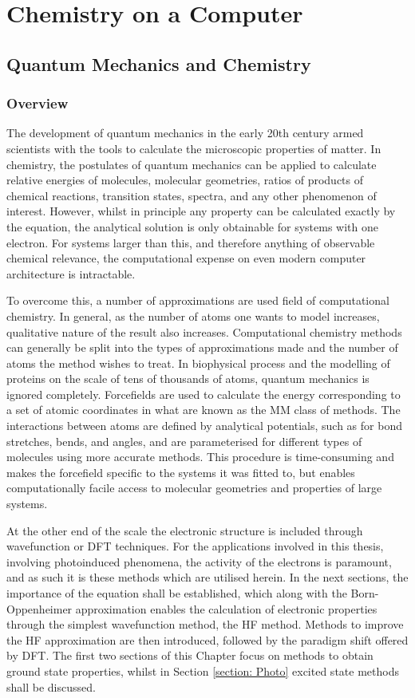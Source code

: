 \chapter{Chemistry on a Computer}
\label{chapter:theory}
\section{Quantum Mechanics and Chemistry}\label{section: QM}
\subsection{Overview}\label{section: QM_overview}
The development of quantum mechanics in the early 20th century armed scientists with the tools to calculate the microscopic properties of matter. In chemistry, the postulates of quantum mechanics can be applied to calculate relative energies of molecules, molecular geometries, ratios of products of chemical reactions, transition states, spectra, and any other phenomenon of interest. However, whilst in principle any property can be calculated exactly by the \schro{} equation, the analytical solution is only obtainable for systems with one electron. For systems larger than this, and therefore anything of observable chemical relevance, the computational expense on even modern computer architecture is intractable. 

To overcome this, a number of approximations are used field of computational chemistry. In general, as the number of atoms one wants to model increases, qualitative nature of the result also increases. Computational chemistry methods can generally be split into the types of approximations made and the number of atoms the method wishes to treat. In biophysical process and the modelling of proteins on the scale of tens of thousands of atoms, quantum mechanics is ignored completely. Forcefields are used to calculate the energy corresponding to a set of atomic coordinates in what are known as the \ac{MM} class of methods. The interactions between atoms are defined by analytical potentials, such as for bond stretches, bends, and angles, and are parameterised for different types of molecules using more accurate methods. This procedure is time-consuming and makes the forcefield specific to the systems it was fitted to, but enables computationally facile access to molecular geometries and properties of large systems.

At the other end of the scale the electronic structure is included through wavefunction or \ac{DFT} techniques. For the applications involved in this thesis, involving photoinduced phenomena, the activity of the electrons is paramount, and as such it is these methods which are utilised herein. In the next sections, the importance of the \schro{} equation shall be established, which along with the Born-Oppenheimer approximation enables the calculation of electronic properties through the simplest wavefunction method, the \ac{HF} method. Methods to improve the \ac{HF} approximation are then introduced, followed by the paradigm shift offered by \ac{DFT}. The first two sections of this Chapter focus on methods to obtain ground state properties, whilst in Section \ref{section: Photo} excited state methods shall be discussed. 
